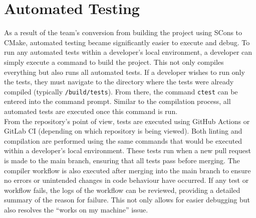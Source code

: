\documentclass[12pt, titlepage]{article}
\begin{document}
\section{Automated Testing}

As a result of the team’s conversion from building the project using SCons to CMake, automated testing became significantly easier to execute and debug.
To run any automated tests within a developer’s local environment, a developer can simply execute a command to build the project. 
This not only compiles everything but also runs all automated tests. If a developer wishes to run only the tests, they must navigate to the directory where the tests were already compiled (typically \texttt{/build/tests}). 
From there, the command \texttt{ctest} can be entered into the command prompt. Similar to the compilation process, all automated tests are executed once this command is run.\\

From the repository’s point of view, tests are executed using GitHub Actions or GitLab CI (depending on which repository is being viewed). 
Both linting and compilation are performed using the same commands that would be executed within a developer’s local environment. These tests run when a new pull request is made to the main branch, ensuring that all tests pass before merging.
The compiler workflow is also executed after merging into the main branch to ensure no errors or unintended changes in code behaviour have occurred. If any test or workflow fails, the logs of the workflow can be reviewed, providing a detailed summary of the reason for failure. 
This not only allows for easier debugging but also resolves the “works on my machine” issue.
		
\end{document}
